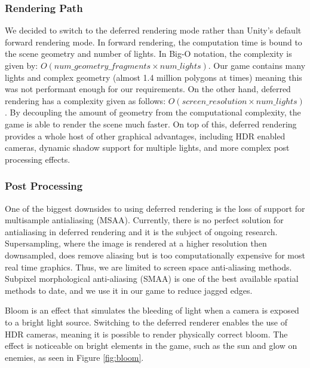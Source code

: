 \documentclass[a4paper,11pt]{article}
\begin{document}
\subsubsection{Rendering Path}
We decided to switch to the deferred rendering mode rather than Unity’s default forward rendering mode. In forward rendering, the computation time is bound to the scene geometry and number of lights. In Big-O notation, the complexity is given by: $O(num\_geometry\_fragments \times num\_lights)$. Our game contains many lights and complex geometry (almost 1.4 million polygons at times) meaning this was not performant enough for our requirements. On the other hand, deferred rendering has a complexity given as follows\cite{unity_deferred}: $O(screen\_resolution \times num\_lights)$. By decoupling the amount of geometry from the computational complexity, the game is able to render the scene much faster. On top of this, deferred rendering provides a whole host of other graphical advantages, including HDR enabled cameras, dynamic shadow support for multiple lights, and more complex post processing effects.

\subsubsection{Post Processing}
One of the biggest downsides to using deferred rendering is the loss of support for multisample antialiasing (MSAA). Currently, there is no perfect solution for antialiasing in deferred rendering and it is the subject of ongoing research. Supersampling, where the image is rendered at a higher resolution then downsampled, does remove aliasing but is too computationally expensive for most real time graphics. Thus, we are limited to screen space anti-aliasing methods. Subpixel morphological anti-aliasing (SMAA) is one of the best available spatial methods to date, and we use it in our game to reduce jagged edges.

Bloom is an effect that simulates the bleeding of light when a camera is exposed to a bright light source. Switching to the deferred renderer enables the use of HDR cameras, meaning it is possible to render physically correct bloom. The effect is noticeable on bright elements in the game, such as the sun and glow on enemies, as seen in Figure \ref{fig:bloom}.
\end{document}
